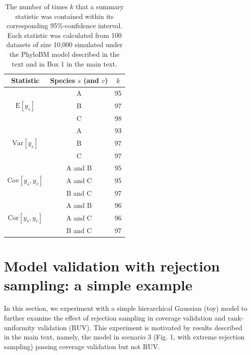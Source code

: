 \documentclass[oneside]{article}
\begin{document}
\begin{table}[h]
  \caption{The number of times $k$ that a summary statistic was contained within its corresponding 95\%-confidence interval.
    Each statistic was calculated from 100 datasets of size 10,000 simulated under the PhyloBM model described in the text and in Box 1 in the main text.}
  \label{suptab:bmsimcis}
  \centering
  \begin{tabular}{ ccc }
    \hline
    Statistic & Species $s$ (and $v$)& $k$\\
    \hline  
    \rowcolor{gray!10}                      & A & 95\\
    \rowcolor{gray!10} $\text{E}[y_s]$      & B & 97\\
    \rowcolor{gray!10}                      & C & 98\\
                                            & A & 93\\
                       $\text{Var}[y_s]$    & B & 97\\
                                            & C & 97\\
    \rowcolor{gray!10}                      & A and B & 95\\
    \rowcolor{gray!10}$\text{Cov}[y_s,y_v]$ & A and C & 95\\
    \rowcolor{gray!10}                      & B and C & 97\\
                                            & A and B & 96\\
                      $\text{Cor}[y_s,y_v]$ & A and C & 96\\
                                            & B and C & 97\\
    \hline
  \end{tabular}
\end{table}

\newpage
\section{Model validation with rejection sampling: a simple example}
\label{sec:supp_toy}

In this section, we experiment with a simple hierarchical Gaussian (toy) model to further examine the effect of rejection sampling in coverage validation and
rank-uniformity validation (RUV).
This experiment is motivated by results described in the main text, namely, the model in scenario 3 (Fig. 1, with extreme rejection sampling) passing coverage validation but not RUV.
\end{document}
